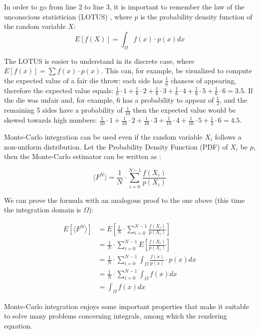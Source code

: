 \documentclass{PoliMi_MasterThesis}
\begin{document}
In order to go from line 2 to line 3, it is important to remember the law of the unconscious statistician (LOTUS) \cite{lotus}, where $p$ is the probability density function of the random variable $X$:
$$E[\textit{f}(X)] = \int_{\Omega}\textit{f}(x)\cdot p(x) dx$$ 

The LOTUS is easier to understand in its discrete case, where $E[\textit{f}(x)] = \sum\textit{f}(x)\cdot p(x)$. This can, for example, be visualized to compute the expected value of a fair die throw: each side has $\frac{1}{6}$ chances of appearing, therefore the expected value equals: $\frac{1}{6} \cdot 1 + \frac{1}{6} \cdot 2 + \frac{1}{6} \cdot 3 + \frac{1}{6} \cdot 4 + \frac{1}{6} \cdot 5 + \frac{1}{6} \cdot 6 = 3.5$. If the die was unfair and, for example, $6$ has a probability to appear of $\frac{1}{2}$, and the remaining 5 sides have a probability of $\frac{1}{10}$ then the expected value would be skewed towards high numbers: $\frac{1}{10} \cdot 1 + \frac{1}{10} \cdot 2 + \frac{1}{10} \cdot 3 + \frac{1}{10} \cdot 4 + \frac{1}{10} \cdot 5 + \frac{1}{2} \cdot 6 = 4.5$. 

Monte-Carlo integration can be used even if the random variable $X_i$ follows a non-uniform distribution. Let the Probability Density Function (PDF) of $X_i$ be $p$, then the Monte-Carlo estimator can be written as \cite{monte_carlo_estimators_veach} \cite{monte_carlo_estimators_scratchapixel}:

$$\langle F^N \rangle = \frac{1}{N}\cdot\sum_{i=0}^{N-1}\frac{\textit{f}(X_i)}{p(X_i)}$$

We can prove the formula with an analogous proof to the one above (this time the integration domain is $\Omega$): 

\begin{subequations}
	\begin{align*}
		E[\langle F^N \rangle] &= E[\frac{1}{N}\cdot\sum_{i=0}^{N-1}\frac{\textit{f}(X_i)}{p(X_i)}] \\
		&= \frac{1}{N}\cdot\sum_{i=0}^{N-1}E[\frac{\textit{f}(X_i)}{p(X_i)}] \\
		&= \frac{1}{N}\cdot\sum_{i=0}^{N-1}\int_{\Omega}\frac{\textit{f}(x)}{p(x)} \cdot p(x) dx \\
		&= \frac{1}{N}\cdot\sum_{i=0}^{N-1}\int_{\Omega}\textit{f}(x) dx \\
		&= \int_{\Omega}\textit{f}(x) dx
	\end{align*}
\end{subequations}

Monte-Carlo integration enjoys some important properties that make it suitable to solve many problems concerning integrals, among which the rendering equation.
\end{document}
